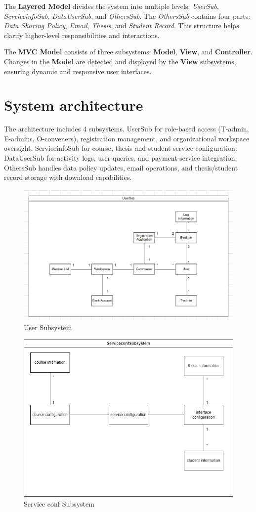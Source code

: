 The \textbf{Layered Model} divides the system into multiple levels: \textit{UserSub}, \textit{ServiceinfoSub}, \textit{DataUserSub}, and \textit{OthersSub}. The \textit{OthersSub} contains four parts: \textit{Data Sharing Policy}, \textit{Email}, \textit{Thesis}, and \textit{Student Record}. This structure helps clarify higher-level responsibilities and interactions.

The \textbf{MVC Model} consists of three subsystems: \textbf{Model}, \textbf{View}, and \textbf{Controller}. Changes in the \textbf{Model} are detected and displayed by the \textbf{View} subsystems, ensuring dynamic and responsive user interfaces.


\section{System architecture}

The architecture includes 4 subsystems. UserSub for role-based access (T-admin, E-admins, O-conveners), registration management, and organizational workspace oversight. ServiceinfoSub for course, thesis and student service configuration. DataUserSub for activity logs, user queries, and payment-service integration. OthersSub handles data policy updates, email operations, and thesis/student record storage with download capabilities.

\begin{figure}[H]
    \centering
    \includegraphics[width=0.75\linewidth]{picture/2-3/2-3-1.png}
    \caption{User Subsystem}
    \label{fig:enter-label}
\end{figure}

\begin{figure}[H]
    \centering
    \includegraphics[width=0.75\linewidth]{picture/2-3/2-3-2.jpg}
    \caption{Service conf Subsystem}
    \label{fig:enter-label}
\end{figure}

